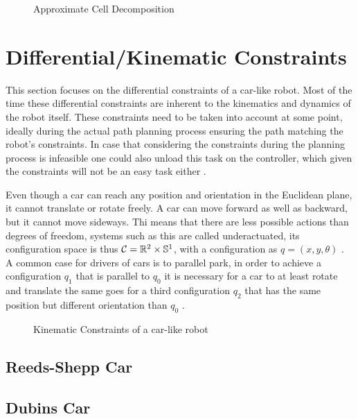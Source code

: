 \begin{figure}[h]
    \caption{Approximate Cell Decomposition}
    \label{fig:cellDecomposition}
\end{figure}

\section{Differential/Kinematic Constraints}
This section focuses on the differential constraints of a car-like robot. Most of the time these differential constraints are inherent to the kinematics and dynamics of the robot itself. These constraints need to be taken into account at some point, ideally during the actual path planning process ensuring the path matching the robot's constraints. In case that considering the constraints during the planning process is infeasible one could also unload this task on the controller, which given the constraints will not be an easy task either \cite{LaValle.2006}.

Even though a car can reach any position and orientation in the Euclidean plane, it cannot translate or rotate freely. A car can move forward as well as backward, but it cannot move sideways. Thi means that there are less possible actions than degrees of freedom, systems such as this are called underactuated, its configuration space is thus $\mathcal{C} = \mathbb{R}^2 \times \mathbb{S}^1$, with a configuration as $q = (x,y,\theta)$ \cite{LaValle.2006}. A common case for drivers of cars is to parallel park, in order to achieve a configuration $q_1$ that is parallel to $q_0$ it is necessary for a car to at least rotate and translate the same goes for a third configuration $q_2$ that has the same position but different orientation than $q_0$ \cite{Latombe.1991}.

\begin{figure}[h]
    \caption{Kinematic Constraints of a car-like robot}
    \label{fig:kinematicConstraints}
\end{figure}

\subsection{Reeds-Shepp Car}

\subsection{Dubins Car}
